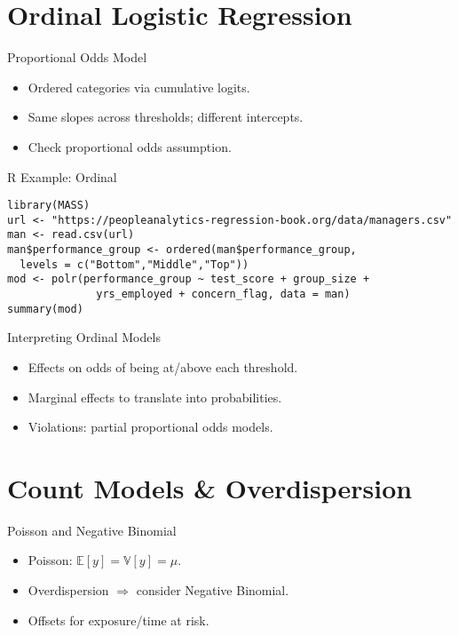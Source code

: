 \documentclass[aspectratio=169]{beamer}
\begin{document}
\section{Ordinal Logistic Regression}

\begin{frame}{Proportional Odds Model}
\begin{itemize}
  \item Ordered categories via cumulative logits.
  \item Same slopes across thresholds; different intercepts.
  \item Check proportional odds assumption.
\end{itemize}
\end{frame}

\begin{frame}[fragile]{R Example: Ordinal}
\begin{lstlisting}[style=rcode]
library(MASS)
url <- "https://peopleanalytics-regression-book.org/data/managers.csv"
man <- read.csv(url)
man$performance_group <- ordered(man$performance_group,
  levels = c("Bottom","Middle","Top"))
mod <- polr(performance_group ~ test_score + group_size +
              yrs_employed + concern_flag, data = man)
summary(mod)
\end{lstlisting}
\end{frame}

\begin{frame}{Interpreting Ordinal Models}
\begin{itemize}
  \item Effects on odds of being at/above each threshold.
  \item Marginal effects to translate into probabilities.
  \item Violations: partial proportional odds models.
\end{itemize}
\end{frame}

\section{Count Models \& Overdispersion}

\begin{frame}{Poisson and Negative Binomial}
\begin{itemize}
  \item Poisson: $\mathbb{E}[y]=\mathbb{V}[y]=\mu$.
  \item Overdispersion $\Rightarrow$ consider Negative Binomial.
  \item Offsets for exposure/time at risk.
\end{itemize}
\end{frame}
\end{document}
